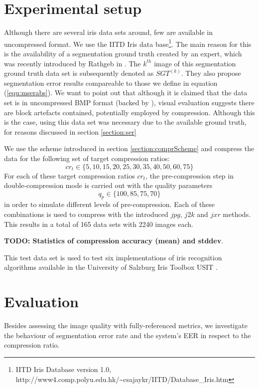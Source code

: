 \documentclass[10pt,twocolumn,letterpaper]{article}
\begin{document}
\section{Experimental setup}
Although there are several iris data sets around, few are available in uncompressed format. We use the IITD Iris data base\footnote{IITD Iris Database version 1.0, http://www4.comp.polyu.edu.hk/\textasciitilde csajaykr/IITD/Database\_Iris.htm}. The main reason for this is the availability of a segmentation ground truth created by an expert, which was recently introduced by Rathgeb \etal in \cite{severeCompression}. The $k^{th}$ image of this segmentation ground truth data set is subsequently denoted as $SGT^{(k)}$. They also propose segmentation error results compareable to those we define in equation (\ref{equ:mserabs}).
We want to point out that although it is claimed that the data set is in uncompressed BMP format (backed by \cite{severeCompression}), visual evaluation suggests there are block artefacts contained, potentially employed by compression. Although this is the case, using this data set was necessary due to the available ground truth, for reasons discussed in section \ref{section:ser}   %

We use the scheme introduced in section \ref{section:comprScheme} and compress the data for the following set of target compression ratios:
\begin{equation}
cr_t \in \{5,10,15,20,25,30,35,40,50,60,75\}
\end{equation}
For each of these target compression ratios $cr_t$, the pre-compression step in double-compression mode is carried out with the quality parameters
\begin{equation}
q_p \in \{100, 85, 75, 70\}
\end{equation} 
in order to simulate different levels of pre-compression. Each of these combinations is used to compress with the introduced $jpg$, $j2k$ and $jxr$ methods. This results in a total of 165 data sets with 2240 images each.

\textbf{TODO: Statistics of compression accuracy (mean) and stddev}.

This test data set is used to test six implementations of iris recognition algorithms available in the University of Salzburg Iris Toolbox USIT \cite{rathgeb}. 



\section{Evaluation}
 Besides assessing the image quality with fully-referenced metrics, we investigate the behaviour of segmentation error rate and the system's EER in respect to the compression ratio.
\end{document}
